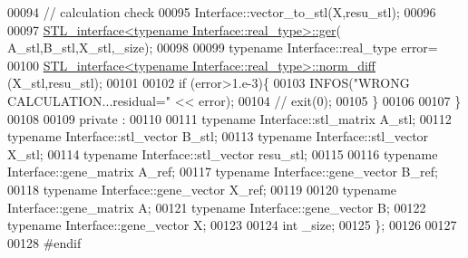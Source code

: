 \begin{DoxyCode}
00094     \textcolor{comment}{// calculation check}
00095     Interface::vector\_to\_stl(X,resu\_stl);
00096 
00097     \hyperlink{class_s_t_l__interface}{STL\_interface<typename Interface::real\_type>::ger}(
      A\_stl,B\_stl,X\_stl,\_size);
00098 
00099     \textcolor{keyword}{typename} Interface::real\_type error=
00100       \hyperlink{class_s_t_l__interface}{STL\_interface<typename Interface::real\_type>::norm\_diff}
      (X\_stl,resu\_stl);
00101 
00102     \textcolor{keywordflow}{if} (error>1.e-3)\{
00103       INFOS(\textcolor{stringliteral}{"WRONG CALCULATION...residual="} << error);
00104 \textcolor{comment}{//       exit(0);}
00105     \}
00106 
00107   \}
00108 
00109 private :
00110 
00111   \textcolor{keyword}{typename} Interface::stl\_matrix A\_stl;
00112   \textcolor{keyword}{typename} Interface::stl\_vector B\_stl;
00113   \textcolor{keyword}{typename} Interface::stl\_vector X\_stl;
00114   \textcolor{keyword}{typename} Interface::stl\_vector resu\_stl;
00115 
00116   \textcolor{keyword}{typename} Interface::gene\_matrix A\_ref;
00117   \textcolor{keyword}{typename} Interface::gene\_vector B\_ref;
00118   \textcolor{keyword}{typename} Interface::gene\_vector X\_ref;
00119 
00120   \textcolor{keyword}{typename} Interface::gene\_matrix A;
00121   \textcolor{keyword}{typename} Interface::gene\_vector B;
00122   \textcolor{keyword}{typename} Interface::gene\_vector X;
00123 
00124   \textcolor{keywordtype}{int} \_size;
00125 \};
00126 
00127 
00128 \textcolor{preprocessor}{#endif}
\end{DoxyCode}
